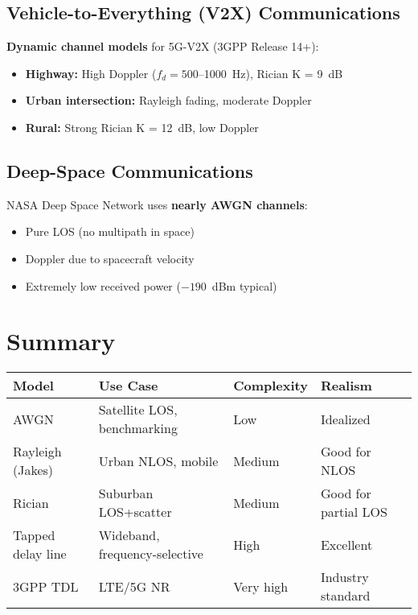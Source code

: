 \subsection{Vehicle-to-Everything (V2X) Communications}

\textbf{Dynamic channel models} for 5G-V2X (3GPP Release 14+):
\begin{itemize}
\item \textbf{Highway:} High Doppler ($f_d = 500$--1000~Hz), Rician K = 9~dB
\item \textbf{Urban intersection:} Rayleigh fading, moderate Doppler
\item \textbf{Rural:} Strong Rician K = 12~dB, low Doppler
\end{itemize}

\subsection{Deep-Space Communications}

NASA Deep Space Network uses \textbf{nearly AWGN channels}:
\begin{itemize}
\item Pure LOS (no multipath in space)
\item Doppler due to spacecraft velocity
\item Extremely low received power ($-190$~dBm typical)
\end{itemize}

\section{Summary}

\begin{center}
\small
\begin{tabular}{@{}p{2.5cm}p{3.5cm}p{2.3cm}p{2.8cm}@{}}
\toprule
\textbf{Model} & \textbf{Use Case} & \textbf{Complexity} & \textbf{Realism} \\
\midrule
AWGN & Satellite LOS, benchmarking & Low & Idealized \\
Rayleigh (Jakes) & Urban NLOS, mobile & Medium & Good for NLOS \\
Rician & Suburban LOS+scatter & Medium & Good for partial LOS \\
Tapped delay line & Wideband, frequency-selective & High & Excellent \\
3GPP TDL & LTE/5G NR & Very high & Industry standard \\
\bottomrule
\end{tabular}
\end{center}

